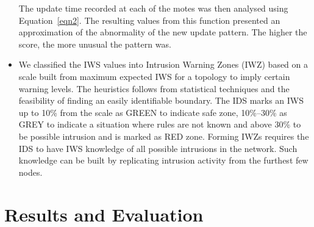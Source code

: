 \documentclass{CRPITStyle}
\begin{document}
\begin{itemize}
The update time recorded at each of the motes was then analysed using Equation~\ref{eqn2}.
The resulting values from this function presented an approximation of the abnormality of the new update pattern. The higher the score, the more unusual the pattern was. 
\item We classified the IWS values into Intrusion Warning Zones (IWZ) based on a scale built from maximum expected IWS for a topology to imply certain warning levels.
The heuristics follows from statistical techniques and the feasibility of finding an easily identifiable boundary.
The IDS marks an IWS up to 10\% from the scale as GREEN to indicate safe zone,
10\%--30\% as GREY to indicate a situation where rules are not known and 
above 30\% to be possible intrusion and is marked as RED zone.
Forming IWZs requires the IDS to have IWS knowledge of all possible intrusions in the network.
Such knowledge can be built by replicating intrusion activity from the furthest few nodes.
\end{itemize}

\section{Results and Evaluation}
\label{sec:eval}
\end{document}
